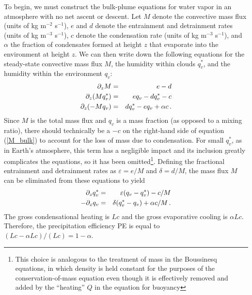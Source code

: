 \documentclass[12pt]{article}
\begin{document}
To begin, we must construct the bulk-plume equations for water vapor in an atmosphere with no net ascent or descent.  Let $M$ denote the convective mass flux (units of kg m$^{-2}$ s$^{-1}$), $e$ and $d$ denote the entrainment and detrainment rates (units of kg m$^{-3}$ s$^{-1}$), $c$ denote the condensation rate (units of kg m$^{-3}$ s$^{-1}$), and $\alpha$ the fraction of condensates formed at height $z$ that evaporate into the environment at height $z$.  We can then write down the following equations for the steady-state convective mass flux $M$, the humidity within clouds $q_v^*$, and the humidity within the environment $q_v$:
\begin{eqnarray}
\partial_z M &=& e - d \label{M_bulk} \\
\partial_z (M q_v^*) &=& e q_v - d q_v^* - c \label{qvs_bulk_1} \\
\partial_z (-M q_v) &=& d q_v^* - e q_v + \alpha c \, . \label{qv_bulk_1}
\end{eqnarray}
Since $M$ is the total mass flux and $q_v$ is a mass fraction (as opposed to a mixing ratio), there should technically be a $-c$ on the right-hand side of equation (\ref{M_bulk}) to account for the loss of mass due to condensation.  For small $q_v^*$, as in Earth's atmosphere, this term has a negligible impact and its inclusion greatly complicates the equations, so it has been omitted\footnote{This choice is analogous to the treatment of mass in the Boussinesq equations, in which density is held constant for the purposes of the conservation-of-mass equation even though it is effectively removed and added by the ``heating'' $Q$ in the equation for buoyancy}.   Defining the fractional entrainment and detrainment rates as $\varepsilon = e/M$ and $\delta = d/M$, the mass flux $M$ can be eliminated from these equations to yield
\begin{eqnarray}
\partial_z q_v^* &=& \varepsilon (q_v - q_v^*) - c/M \label{qvs_bulk_2} \\
- \partial_z q_v &=& \delta (q_v^* - q_v) + \alpha c / M \, . \label{qv_bulk_2} 
\end{eqnarray}
The gross condensational heating is $Lc$ and the gross evaporative cooling is $\alpha Lc$.  Therefore, the precipitation efficiency PE is equal to $(Lc-\alpha Lc)/(Lc) = 1-\alpha$.
\end{document}
